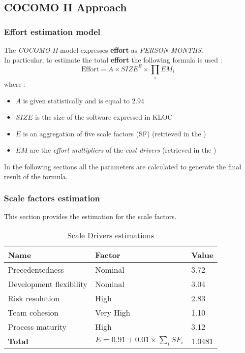 \subsection{COCOMO II Approach} %
\label{sec:cocomo_approach}

\subsubsection{Effort estimation model}
The \emph{COCOMO II} model expresses \textbf{effort} as \emph{PERSON-MONTHS}.\\
In particular, to estimate the total \textbf{effort} the following formula is used :
\begin{equation}
    \textrm{Effort} = A \times SIZE^E \times \prod_i EM_i
    \label{eq:effort}
\end{equation}
where :
\begin{itemize}
	\item $A$ is given statistically and is equal to $2.94$
	\item $SIZE$ is the size of the software expressed in KLOC
	\item $E$ is an aggregation of five scale factors (SF) (retrieved in the )
	\item $EM$ are the \emph{effort multipliers} of the \emph{cost drivers} (retrieved in the )
\end{itemize}
In the following sections all the parameters are calculated to generate the final result of the formula.

\subsubsection{Scale factors estimation}
\label{sub:scale_factors}
This section provides the estimation for the scale factors.
\begin{table}[!htbp]
    \centering
    \begin{tabular}{| l | l | l |}
        \hline
        \textbf{Name}             & \textbf{Factor}   & \textbf{Value}    \\
        \hline
        Precedentedness           & Nominal           & 3.72                 \\
        \hline
        Development flexibility   & Nominal           & 3.04                 \\
        \hline
        Risk resolution           & High              & 2.83                 \\
        \hline
        Team cohesion             & Very High         & 1.10                 \\
        \hline
        Process maturity          & High              & 3.12                 \\
        \hline
        \textbf{Total}  & \multicolumn{1}{|c|}{$E=0.91 + 0.01 \times \sum_{i}SF_i$}    & 1.0481       \\
        \hline
    \end{tabular}
    \caption{Scale Drivers estimations}
    \label{tab:scale-drivers}
\end{table}


